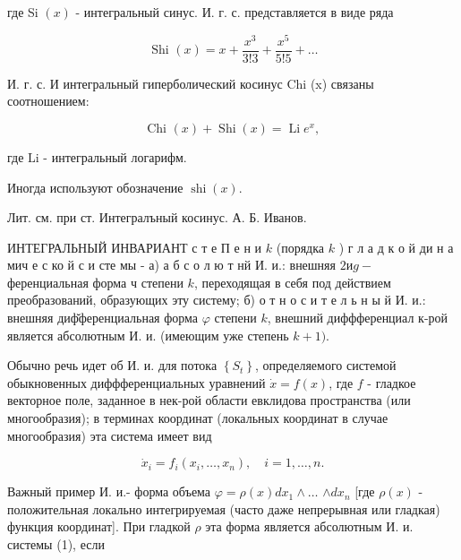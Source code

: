 \documentclass[10pt]{article}
\begin{document}
где Si $(x)$ - интегральный синус. И. г. с. представляется в виде ряда



\[

\text { Shi }(x)=x+\frac{x^{3}}{3 ! 3}+\frac{x^{5}}{5 ! 5}+\ldots

\]



И. г. с. И интегральный гиперболический косинус Chi (x) связаны соотношением:



\[

\text { Chi }(x)+\operatorname{Shi}(x)=\operatorname{Li} e^{x} \text {, }

\]



где $\mathrm{Li}$ - интегральный логарифм.



Иногда используют обозначение $\operatorname{shi}(x)$.



Лит. см. при ст. Интегралъный косинус. А. Б. Иванов.



ИНТЕГРАЛЬНЫЙ ИНВАРИАНТ с т е П е н и $k$ (порядка $k$ ) г л а д к о й ди н а мич е с ко й с и сте мы - а) а б с о л ю т нй И. и.: внешняя $2 и g-$ ференциальная форма ч степени $k$, переходящая в себя под действием преобразований, образующих эту систему; б) о т н о с и т е л ь н ы й И. и.: внешняя диф̆ференциальная форма $\varphi$ степени $k$, внешний диффференциал к-рой является абсолютным И. и. (имеющим уже степень $k+1)$.



Обычно речь идет об И. и. для потока $\left\{S_{t}\right\}$, определяемого системой обыкновенных диффференциальных уравнений $\dot{x}=f(x)$, где $f$ - гладкое векторное поле, заданное в нек-рой области евклидова пространства (или многообразия); в терминах координат (локальных координат в случае многообразия) эта система имеет вид



\[

\dot{x}_{i}=f_{i}\left(x_{i}, \ldots, x_{n}\right), \quad i=1, \ldots, n .

\]



Важный пример И. и.- форма объема $\varphi=\rho(x) d x_{1} \wedge \ldots$ $\wedge d x_{n}$ [где $\rho(x)$ - положительная локально интегрируемая (часто даже непрерывная или гладкая) функция координат]. При гладкой $\rho$ эта форма является абсолютным И. и. системы (1), если
\end{document}
